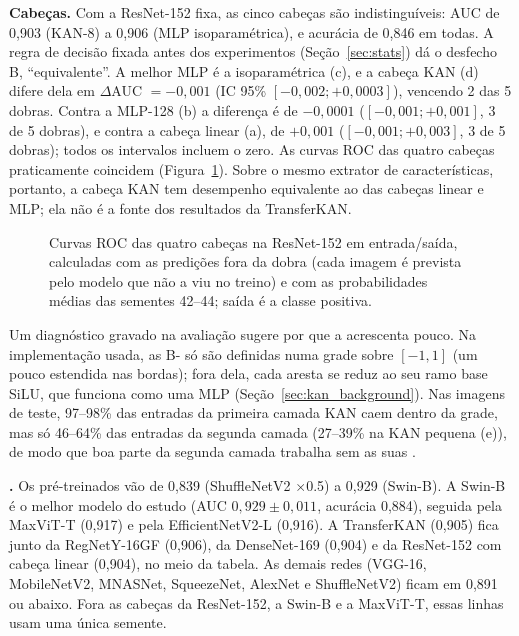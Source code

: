 

\textbf{Cabeças.} Com a ResNet-152 fixa, as cinco cabeças são indistinguíveis: AUC de 0,903 (KAN-8) a 0,906 (MLP isoparamétrica), e acurácia de 0,846 em todas. A regra de decisão fixada antes dos experimentos (Seção~\ref{sec:stats}) dá o desfecho B, ``equivalente''. A melhor \gls{MLP} é a isoparamétrica (c), e a cabeça KAN (d) difere dela em $\Delta$AUC $= -0{,}001$ (IC 95\% $[-0{,}002; +0{,}0003]$), vencendo 2 das 5 dobras. Contra a MLP-128 (b) a diferença é de $-0{,}0001$ ($[-0{,}001; +0{,}001]$, 3 de 5 dobras), e contra a cabeça linear (a), de $+0{,}001$ ($[-0{,}001; +0{,}003]$, 3 de 5 dobras); todos os intervalos incluem o zero. As curvas \gls{ROC} das quatro cabeças praticamente coincidem (Figura~\ref{fig:roc_es}). Sobre o mesmo extrator de características, portanto, a cabeça KAN tem desempenho equivalente ao das cabeças linear e MLP; ela não é a fonte dos resultados da TransferKAN.

\begin{figure}[!htbp]
\centering

\caption{Curvas ROC das quatro cabeças na ResNet-152 em entrada/saída, calculadas com as predições fora da dobra (cada imagem é prevista pelo modelo que não a viu no treino) e com as probabilidades médias das sementes 42--44; saída é a classe positiva.}
\label{fig:roc_es}
\end{figure}

Um diagnóstico gravado na avaliação sugere por que a  acrescenta pouco. Na implementação usada, as B- só são definidas numa grade sobre $[-1, 1]$ (um pouco estendida nas bordas); fora dela, cada aresta se reduz ao seu ramo base \gls{SiLU}, que funciona como uma MLP (Seção~\ref{sec:kan_background}). Nas imagens de teste, 97--98\% das entradas da primeira camada KAN caem dentro da grade, mas só 46--64\% das entradas da segunda camada (27--39\% na KAN pequena (e)), de modo que boa parte da segunda camada trabalha sem as suas .

\textbf{.} Os  pré-treinados vão de 0,839 (ShuffleNetV2 $\times$0.5) a 0,929 (Swin-B). A Swin-B é o melhor modelo do estudo (AUC $0{,}929 \pm 0{,}011$, acurácia 0,884), seguida pela MaxViT-T (0,917) e pela EfficientNetV2-L (0,916). A TransferKAN (0,905) fica junto da RegNetY-16GF (0,906), da DenseNet-169 (0,904) e da ResNet-152 com cabeça linear (0,904), no meio da tabela. As demais redes (VGG-16, MobileNetV2, MNASNet, SqueezeNet, AlexNet e ShuffleNetV2) ficam em 0,891 ou abaixo. Fora as cabeças da ResNet-152, a Swin-B e a MaxViT-T, essas linhas usam uma única semente.

